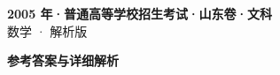 \documentclass[zihao=-4, a4paper]{ctexart}
\begin{document}
\begin{center}
  {\Large\bfseries 2005 年·普通高等学校招生考试·山东卷·文科}\\[4pt]
  {\large 数学 · 解析版}
\end{center}
\medskip
{}

\clearpage
{}
\begin{center}{\Large\bfseries 参考答案与详细解析}\end{center}
\medskip

\end{document}
